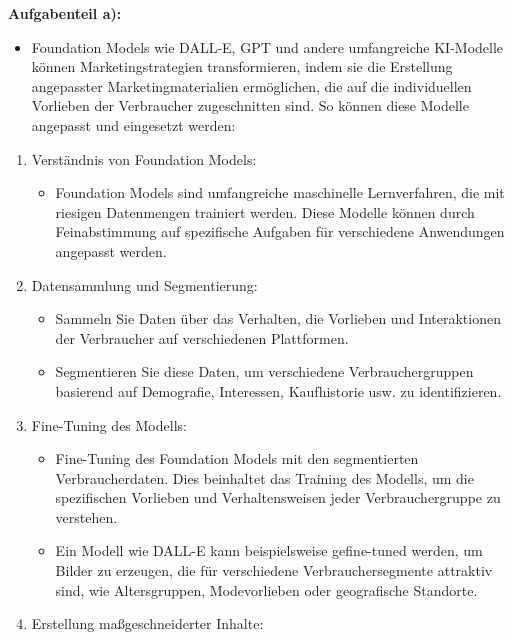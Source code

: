 \documentclass[12pt,ngerman]{AssignmentClass}
\begin{document}
        \textbf{Aufgabenteil a):}
            \begin{itemize}
                \item Foundation Models wie DALL-E, GPT und andere umfangreiche KI-Modelle können Marketingstrategien transformieren, indem sie die Erstellung angepasster Marketingmaterialien ermöglichen, die auf die individuellen Vorlieben der Verbraucher zugeschnitten sind. So können diese Modelle angepasst und eingesetzt werden:
            \end{itemize}
        \begin{enumerate}
            \item Verständnis von Foundation Models:
                \begin{itemize}
                    \item Foundation Models sind umfangreiche maschinelle Lernverfahren, die mit riesigen Datenmengen trainiert werden. Diese Modelle können durch Feinabstimmung auf spezifische Aufgaben für verschiedene Anwendungen angepasst werden.
                \end{itemize}
            \item Datensammlung und Segmentierung:
                \begin{itemize}
                    \item Sammeln Sie Daten über das Verhalten, die Vorlieben und Interaktionen der Verbraucher auf verschiedenen Plattformen.
                    \item Segmentieren Sie diese Daten, um verschiedene Verbrauchergruppen basierend auf Demografie, Interessen, Kaufhistorie usw. zu identifizieren.
                \end{itemize}
            \item Fine-Tuning des Modells:
                \begin{itemize}
                    \item Fine-Tuning des Foundation Models mit den segmentierten Verbraucherdaten. Dies beinhaltet das Training des Modells, um die spezifischen Vorlieben und Verhaltensweisen jeder Verbrauchergruppe zu verstehen.
                    \item Ein Modell wie DALL-E kann beispielsweise gefine-tuned werden, um Bilder zu erzeugen, die für verschiedene Verbrauchersegmente attraktiv sind, wie Altersgruppen, Modevorlieben oder geografische Standorte.
                \end{itemize}
            \item Erstellung maßgeschneiderter Inhalte:

\end{enumerate}
\end{document}
